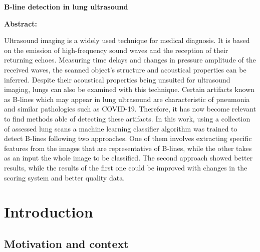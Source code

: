\documentclass[11pt]{article} %
\begin{document}
{\bfseries \large B-line detection in lung ultrasound }\vspace{10mm} 

{\bfseries \large Abstract: }\vspace{5mm} 

Ultrasound imaging is a widely used technique for medical diagnosis. It is based on the emission of high-frequency sound waves and the reception of their returning echoes. Measuring time delays and changes in pressure amplitude of the received waves, the scanned object's structure and acoustical properties can be inferred. Despite their acoustical properties being unsuited for ultrasound imaging, lungs can also be examined with this technique. Certain artifacts known as B-lines which may appear in lung ultrasound are characteristic of pneumonia and similar pathologies such as COVID-19. Therefore, it has now become relevant to find methods able of detecting these artifacts. In this work, using a collection of assessed lung scans a machine learning classifier algorithm was trained to detect B-lines following two approaches. One of them involves extracting specific features from the images that are representative of B-lines, while the other takes as an input the whole image to be classified. The second approach showed better results, while the results of the first one could be improved with changes in the scoring system and better quality data.
 
\vspace{1cm}

\newpage



\tableofcontents
\newpage


\normalsize

\section{Introduction}

\subsection{Motivation and context}
\end{document}
